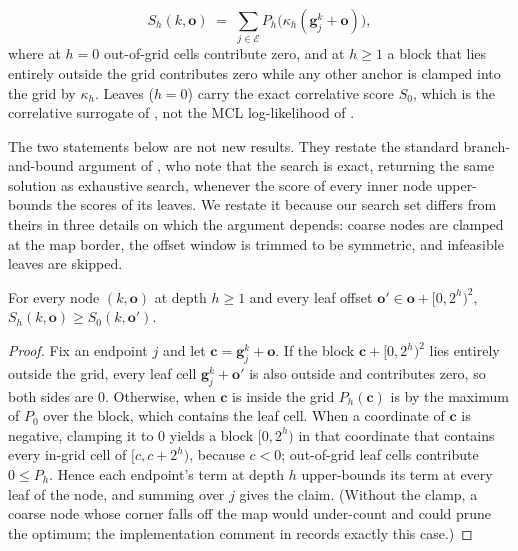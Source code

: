 \begin{equation}\label{eq:bbsscore}
  S_h(k,\mathbf{o}) \;=\; \sum_{j\in\mathcal{E}} P_h\big(\kappa_h(\mathbf{g}_j^{k}+\mathbf{o})\big),
\end{equation}
where at $h=0$ out-of-grid cells contribute zero, and at $h\ge1$ a block that lies entirely outside the grid contributes zero while any other anchor is clamped into the grid by $\kappa_h$. Leaves ($h=0$) carry the exact correlative score $S_0$, which is the correlative surrogate of \citet{olson2009correlative,hess2016realtime}, not the MCL log-likelihood of .

The two statements below are not new results. They restate the standard branch-and-bound argument of \citet{hess2016realtime}, who note that the search is exact, returning the same solution as exhaustive search, whenever the score of every inner node upper-bounds the scores of its leaves. We restate it because our search set differs from theirs in three details on which the argument depends: coarse nodes are clamped at the map border, the offset window is trimmed to be symmetric, and infeasible leaves are skipped.

\begin{proposition}\label{prop:bbs}
For every node $(k,\mathbf{o})$ at depth $h\ge1$ and every leaf offset $\mathbf{o}'\in\mathbf{o}+[0,2^h)^2$, $S_h(k,\mathbf{o})\ge S_0(k,\mathbf{o}')$.
\end{proposition}
\begin{proof}
Fix an endpoint $j$ and let $\mathbf{c}=\mathbf{g}_j^k+\mathbf{o}$. If the block $\mathbf{c}+[0,2^h)^2$ lies entirely outside the grid, every leaf cell $\mathbf{g}_j^k+\mathbf{o}'$ is also outside and contributes zero, so both sides are $0$. Otherwise, when $\mathbf{c}$ is inside the grid $P_h(\mathbf{c})$ is by  the maximum of $P_0$ over the block, which contains the leaf cell. When a coordinate of $\mathbf{c}$ is negative, clamping it to $0$ yields a block $[0,2^h)$ in that coordinate that contains every in-grid cell of $[c,c+2^h)$, because $c<0$; out-of-grid leaf cells contribute $0\le P_h$. Hence each endpoint's term at depth $h$ upper-bounds its term at every leaf of the node, and summing over $j$ gives the claim. (Without the clamp, a coarse node whose corner falls off the map would under-count and could prune the optimum; the implementation comment in  records exactly this case.)
\end{proof}

